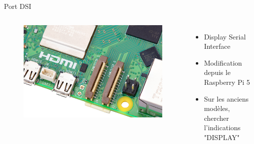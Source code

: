 \documentclass[aspectratio=169,xcolor=dvipsnames]{beamer}
\begin{document}
\begin{frame}{Port DSI}
    \begin{columns}[c] %

        \begin{figure}
            \includegraphics[width=1\textwidth]{2/rpi-5-dsi-csi.jpg}
        \end{figure}

        \begin{itemize}
            \item Display Serial Interface
            \item Modification depuis le Raspberry Pi 5
            \item Sur les anciens modèles, chercher l'indications "DISPLAY"
        \end{itemize}

    \end{columns}
\end{frame}
\end{document}
